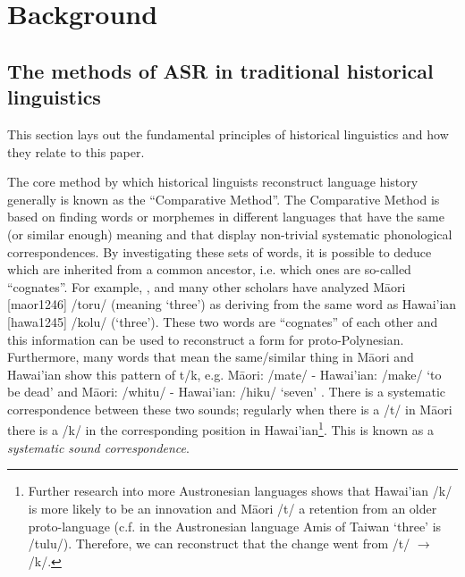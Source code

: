 \documentclass[12pt,letterpaper]{article}
\begin{document}

\FloatBarrier
\section{Background}
\label{recon_grammar}

\subsection{The methods of ASR in traditional historical linguistics}
\label{sec:ars:metod:hist}
This section lays out the fundamental principles of historical linguistics and how they relate to this paper.

The core method by which historical linguists reconstruct language history generally is known as the ``Comparative Method''. The Comparative Method is based on finding words or morphemes in different languages that have the same (or similar enough) meaning and that display non-trivial systematic phonological correspondences. By investigating these sets of words, it is possible to deduce which are inherited from a common ancestor, i.e. which ones are so-called ``cognates''. For example, \citet{blust2004}, \citet{greenhill2011pollex} and many other scholars have analyzed M\={a}ori [maor1246] /toru/ (meaning `three') as deriving from the same word as Hawai'ian [hawa1245] /kolu/ (`three'). These two words are ``cognates'' of each other and this information can be used to reconstruct a form for proto-Polynesian. Furthermore, many words that mean the same/similar thing in M\={a}ori and Hawai'ian show this pattern of t/k, e.g. M\={a}ori: /mate/ - Hawai'ian: /make/ `to be dead' and M\={a}ori: /whitu/ - Hawai'ian: /hiku/ `seven' \citep{ABVD}. There is a systematic correspondence between these two sounds; regularly when there is a /t/ in M\={a}ori there is a /k/ in the corresponding position in Hawai'ian\footnote{Further research into more Austronesian languages shows that Hawai'ian /k/ is more likely to be an innovation and M\={a}ori /t/ a retention from an older proto-language (c.f. in the Austronesian language Amis of Taiwan `three' is /tulu/). Therefore, we can reconstruct that the change went from /t/ $\rightarrow$ /k/.}. This is known as a \emph{systematic sound correspondence}. 
\end{document}
